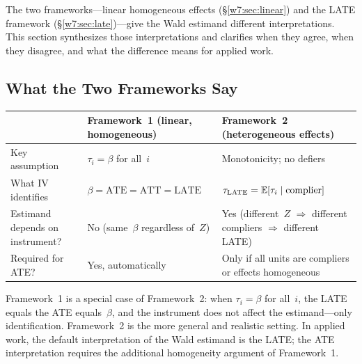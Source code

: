 \documentclass[master.tex]{subfiles}
\begin{document}
The two frameworks---linear homogeneous effects
(\S\ref{w7:sec:linear}) and the LATE framework
(\S\ref{w7:sec:late})---give the Wald estimand different
interpretations.  This section synthesizes those interpretations
and clarifies when they agree, when they disagree, and what the
difference means for applied work.

\subsection{What the Two Frameworks Say}

\begin{tcolorbox}[defstyle, title={What IV Identifies: A Comparison of the Two Frameworks}]
\renewcommand{\arraystretch}{1.6}
\begin{tabular}{p{2.4cm} p{4.6cm} p{5.0cm}}
  \toprule
  & \textbf{Framework~1}
    (linear, homogeneous)
  & \textbf{Framework~2}
    (heterogeneous effects) \\
  \midrule
  Key assumption
    & $\tau_i = \beta$ for all~$i$
    & Monotonicity; no defiers \\
  What IV identifies
    & $\beta = \mathrm{ATE} = \mathrm{ATT} = \mathrm{LATE}$
    & $\tau_{\mathrm{LATE}} = \mathbb{E}[\tau_i \mid \text{complier}]$ \\
  Estimand depends on instrument?
    & No (same~$\beta$ regardless of~$Z$)
    & Yes (different~$Z$ $\Rightarrow$ different compliers
      $\Rightarrow$ different LATE) \\
  Required for ATE?
    & Yes, automatically
    & Only if all units are compliers or effects homogeneous \\
  \bottomrule
\end{tabular}
\renewcommand{\arraystretch}{1}
\end{tcolorbox}

Framework~1 is a special case of Framework~2: when
$\tau_i = \beta$ for all~$i$, the LATE equals the ATE equals~$\beta$,
and the instrument does not affect the estimand---only identification.
Framework~2 is the more general and realistic setting.  In applied
work, the default interpretation of the Wald estimand is the LATE;
the ATE interpretation requires the additional homogeneity argument
of Framework~1.
\end{document}
